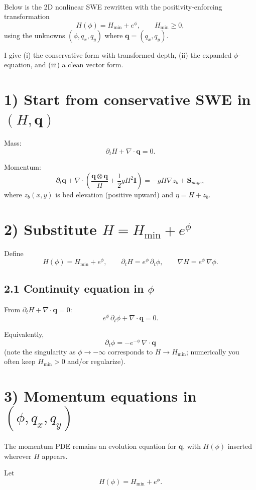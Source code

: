 \documentclass[11pt]{article}
\begin{document}
\


Below is the 2D nonlinear SWE rewritten with the positivity-enforcing transformation
\[
H(\phi)=H_{\min}+e^{\phi},\qquad H_{\min}\ge 0,
\]
using the unknowns $(\phi,q_x,q_y)$ where $\mathbf{q}=(q_x,q_y)$.

I give (i) the conservative form with transformed depth, (ii) the expanded $\phi$-equation, and (iii) a clean vector form.

\section*{1) Start from conservative SWE in $(H,\mathbf{q})$}

Mass:
\[
\partial_t H+\nabla\cdot\mathbf{q}=0.
\]

Momentum:
\[
\partial_t \mathbf{q}+\nabla\cdot\!\left(\frac{\mathbf{q}\otimes\mathbf{q}}{H}+\frac{1}{2}gH^2\mathbf{I}\right)
=-gH\nabla z_b+\mathbf{S}_{phys},
\]
where $z_b(x,y)$ is bed elevation (positive upward) and $\eta=H+z_b$.

\section*{2) Substitute $H = H_{\min}+e^{\phi}$}

Define
\[
H(\phi)=H_{\min}+e^{\phi},\qquad
\partial_t H = e^{\phi}\,\partial_t\phi,\qquad
\nabla H = e^{\phi}\,\nabla\phi.
\]

\subsection*{2.1 Continuity equation in $\phi$}

From $\partial_t H+\nabla\cdot\mathbf{q}=0$:
\[
e^{\phi}\,\partial_t\phi+\nabla\cdot\mathbf{q}=0.
\]

Equivalently,
\[
\boxed{\;\partial_t\phi=-e^{-\phi}\,\nabla\cdot\mathbf{q}\;}
\]
(note the singularity as $\phi\to -\infty$ corresponds to $H\to H_{\min}$; numerically you often keep $H_{\min}>0$ and/or regularize).

\section*{3) Momentum equations in $(\phi,q_x,q_y)$}

The momentum PDE remains an evolution equation for $\mathbf{q}$, with $H(\phi)$ inserted wherever $H$ appears.

Let
\[
H(\phi)=H_{\min}+e^{\phi}.
\]
\end{document}
